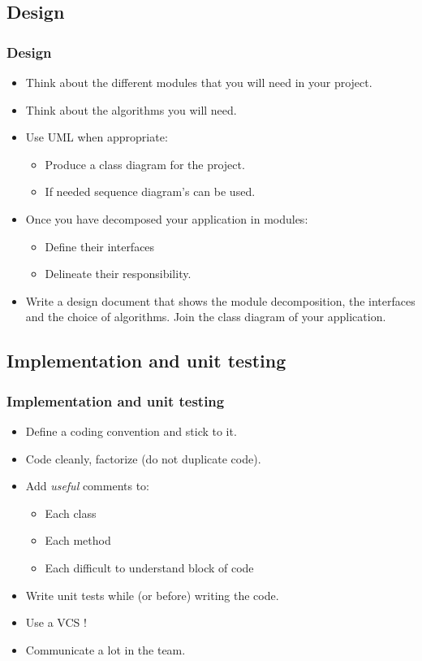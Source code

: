 \documentclass[10pt]{beamer}
\begin{document}
\subsection{Design}
\begin{frame}
  \frametitle{Design}
  \begin{itemize}
  \item Think about the different modules that you will need in your project.
  \item Think about the algorithms you will need.
  \item Use UML when appropriate:
    \begin{itemize}
      \item Produce a class diagram for the project.
      \item If needed sequence diagram's can be used.
    \end{itemize}
  \item Once you have decomposed your application in modules:
    \begin{itemize}
    \item Define their interfaces
    \item Delineate their responsibility.
    \end{itemize}
  \item Write a design document that shows the module decomposition, the
    interfaces and the choice of algorithms. Join the class diagram of your application.
  \end{itemize}
\end{frame}

\subsection{Implementation and unit testing}
\begin{frame}
  \frametitle{Implementation and unit testing}
  \begin{itemize}
  \item Define a coding convention and stick to it.
  \item Code cleanly, factorize (do not duplicate code).
  \item Add \emph{useful} comments to:
    \begin{itemize}
    \item Each class
    \item Each method
    \item Each difficult to understand block of code
    \end{itemize}
  \item Write unit tests while (or before) writing the code.
  \item Use a VCS !
  \item Communicate a lot in the team.
  \end{itemize}
\end{frame}
\end{document}
